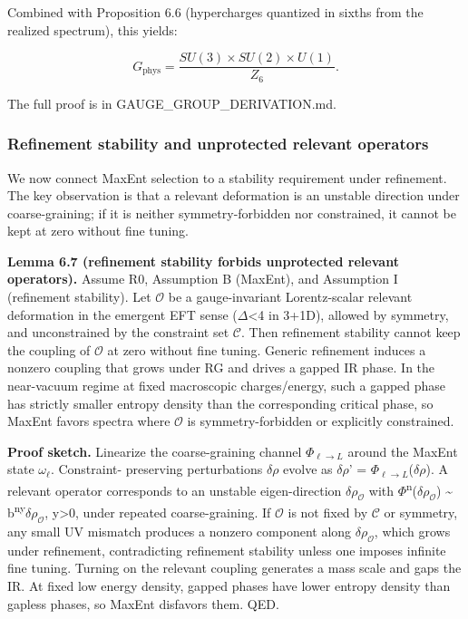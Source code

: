 \documentclass[11pt,a4paper]{article}
\theoremstyle{remark}
\begin{document}
Combined with Proposition 6.6 (hypercharges quantized in sixths from the
realized spectrum), this yields:

\[
G_{\mathrm{phys}} = \frac{SU(3) \times SU(2) \times U(1)}{Z_6}.
\]

The full proof is in GAUGE\_GROUP\_DERIVATION.md.

\subsubsection{Refinement stability and unprotected relevant operators}\label{refinement-stability-and-unprotected-relevant-operators}

We now connect MaxEnt selection to a stability requirement under refinement.
The key observation is that a relevant deformation is an unstable direction
under coarse-graining; if it is neither symmetry-forbidden nor constrained, it
cannot be kept at zero without fine tuning.

\textbf{Lemma 6.7 (refinement stability forbids unprotected relevant operators).}
Assume R0, Assumption B (MaxEnt), and Assumption I (refinement stability).
Let \ensuremath{\mathcal{O}} be a gauge-invariant Lorentz-scalar relevant deformation
in the emergent EFT sense (\ensuremath{\Delta}\textless4 in 3+1D), allowed by symmetry,
and unconstrained by the constraint set \ensuremath{\mathcal{C}}. Then refinement stability
cannot keep the coupling of \ensuremath{\mathcal{O}} at zero without fine tuning.
Generic refinement induces a nonzero coupling that grows under RG and
drives a gapped IR phase. In the near-vacuum regime at fixed macroscopic
charges/energy, such a gapped phase has strictly smaller entropy density
than the corresponding critical phase, so MaxEnt favors spectra where
\ensuremath{\mathcal{O}} is symmetry-forbidden or explicitly constrained.

\textbf{Proof sketch.} Linearize the coarse-graining channel
\(\Phi_{\ell\to{}L}\) around the MaxEnt state \(\omega_{\ell}\). Constraint-
preserving perturbations \ensuremath{\delta}\ensuremath{\rho} evolve as
\ensuremath{\delta}\ensuremath{\rho}' = \(\Phi_{\ell\to{}L}\)(\ensuremath{\delta}\ensuremath{\rho}). A relevant operator corresponds
to an unstable eigen-direction \ensuremath{\delta}\(\rho_{\mathcal{O}}\) with
\textbar{}\ensuremath{\Phi}\textsuperscript{n}(\ensuremath{\delta}\(\rho_{\mathcal{O}}\))\textbar{} \textasciitilde{} b\textsuperscript{n}\textsuperscript{y}\textbar{}\ensuremath{\delta}\(\rho_{\mathcal{O}}\)\textbar,
y\textgreater0, under repeated coarse-graining. If \ensuremath{\mathcal{O}} is not fixed by
\ensuremath{\mathcal{C}} or symmetry, any small UV mismatch produces a nonzero
component along \ensuremath{\delta}\(\rho_{\mathcal{O}}\), which grows under refinement,
contradicting refinement stability unless one imposes infinite fine tuning.
Turning on the relevant coupling generates a mass scale and gaps the IR.
At fixed low energy density, gapped phases have lower entropy density than
gapless phases, so MaxEnt disfavors them. QED.
\end{document}
